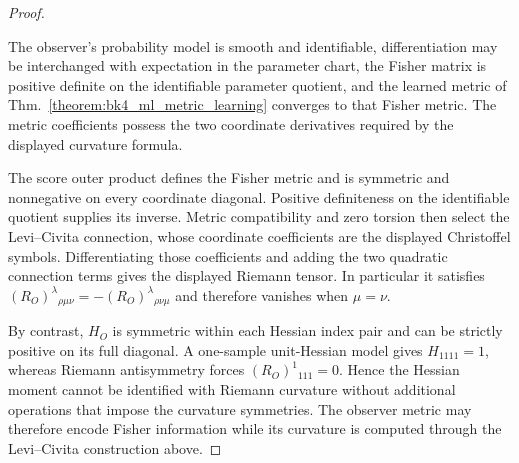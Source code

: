 \begin{proof}
\label{proof:bk4_information_curvature}
\leavevmode

\begin{assumption}
The observer's probability model is smooth and identifiable, differentiation
may be interchanged with expectation in the parameter chart, the Fisher matrix
is positive definite on the identifiable parameter quotient, and the learned
metric of Thm.~\ref{theorem:bk4_ml_metric_learning} converges to that Fisher
metric. The metric coefficients possess the two coordinate derivatives required
by the displayed curvature formula.
\end{assumption}

The score outer product defines the Fisher metric and is symmetric and
nonnegative on every coordinate diagonal. Positive definiteness on the
identifiable quotient supplies its inverse. Metric compatibility and zero
torsion then select the Levi--Civita connection, whose coordinate coefficients
are the displayed Christoffel symbols. Differentiating those coefficients and
adding the two quadratic connection terms gives the displayed Riemann tensor.
In particular it satisfies
$(R_O)^{\lambda}{}_{\rho\mu\nu}
=-(R_O)^{\lambda}{}_{\rho\nu\mu}$ and therefore vanishes when
$\mu=\nu$.

By contrast, $H_O$ is symmetric within each Hessian index pair and can be
strictly positive on its full diagonal. A one-sample unit-Hessian model gives
$H_{1111}=1$, whereas Riemann antisymmetry forces
$(R_O)^{1}{}_{111}=0$. Hence the Hessian moment cannot be identified with
Riemann curvature without additional operations that impose the curvature
symmetries. The observer metric may therefore encode Fisher information while
its curvature is computed through the Levi--Civita construction above.
\end{proof}

